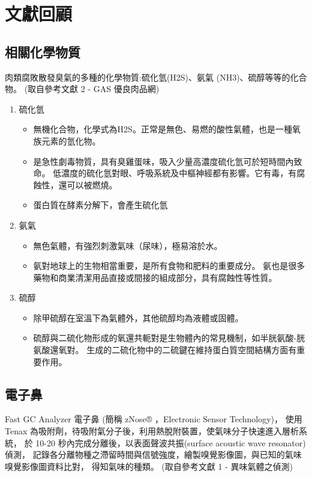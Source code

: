 \chapter{文獻回顧}

\section{相關化學物質}
肉類腐敗散發臭氣的多種的化學物質:硫化氫(H2S)、氨氣 (NH3)、硫醇等等的化合物。
(取自參考文獻 2 - GAS 優良肉品網) 
\begin{enumerate}
	\item 硫化氫 \begin{itemize}
		\item 無機化合物，化學式為H2S。正常是無色、易燃的酸性氣體，也是一種氧族元素的氫化物。
		\item 是急性劇毒物質，具有臭雞蛋味，吸入少量高濃度硫化氫可於短時間內致命。
			低濃度的硫化氫對眼、呼吸系統及中樞神經都有影響。它有毒，有腐蝕性，還可以被燃燒。
		\item 蛋白質在酵素分解下，會產生硫化氫
	\end{itemize}
	\item 氨氣 \begin{itemize}
		\item 無色氣體，有強烈刺激氣味（尿味），極易溶於水。
		\item 氨對地球上的生物相當重要，是所有食物和肥料的重要成分。
			氨也是很多藥物和商業清潔用品直接或間接的組成部分，具有腐蝕性等性質。
	\end{itemize}
	\item 硫醇 \begin{itemize}
		\item 除甲硫醇在室溫下為氣體外，其他硫醇均為液體或固體。
		\item 硫醇與二硫化物形成的氧還共軛對是生物體內的常見機制，如半胱氨酸-胱氨酸還氧對。
			生成的二硫化物中的二硫鍵在維持蛋白質空間結構方面有重要作用。
	\end{itemize}
\end{enumerate}

\section{電子鼻}
Fast GC Analyzer 電子鼻 (簡稱 zNose® ，Electronic Sensor Technology)，
使用 Tenax 為吸附劑，待吸附氣分子後，利用熱脫附裝置，使氣味分子快速進入層析系統，
於 10-20 秒內完成分離後，以表面聲波共振(surface acoustic wave resonator) 偵測，
記錄各分離物種之滯留時間與信號強度，繪製嗅覺影像圖，與已知的氣味嗅覺影像圖資料比對，
得知氣味的種類。 (取自參考文獻 1 - 異味氣體之偵測) 

